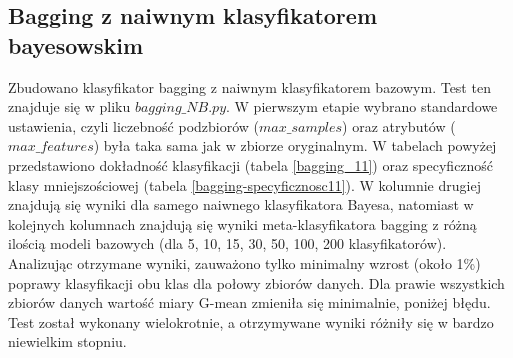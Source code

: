 \subsection{Bagging z naiwnym klasyfikatorem bayesowskim}
Zbudowano klasyfikator bagging z naiwnym klasyfikatorem bazowym. Test ten znajduje się w pliku $bagging\_NB.py$. W pierwszym etapie wybrano standardowe ustawienia, czyli liczebność podzbiorów ($max\_samples$) oraz atrybutów ($max\_features$) była taka sama jak w zbiorze oryginalnym.
W tabelach powyżej przedstawiono dokładność klasyfikacji (tabela \ref{bagging_11}) oraz specyficzność klasy mniejszościowej (tabela \ref{bagging-specyficznosc11}). W kolumnie drugiej znajdują się wyniki dla samego naiwnego klasyfikatora Bayesa, natomiast w kolejnych kolumnach znajdują się wyniki meta-klasyfikatora bagging z różną ilością modeli bazowych (dla 5, 10, 15, 30, 50, 100, 200 klasyfikatorów). Analizując otrzymane wyniki, zauważono tylko minimalny wzrost (około 1\%) poprawy klasyfikacji obu klas dla połowy zbiorów danych. Dla prawie wszystkich zbiorów danych wartość miary G-mean zmieniła się minimalnie, poniżej błędu. Test został wykonany wielokrotnie, a otrzymywane wyniki różniły się w bardzo niewielkim stopniu. 
